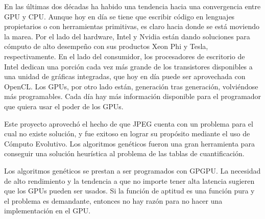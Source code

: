 En las últimas dos décadas ha habido una tendencia hacia una convergencia entre
GPU y CPU. Aunque hoy en día se tiene que escribir código en lenguajes
propietarios o con herramientas primitivas, es claro hacia donde se está
moviendo la marea. Por el lado del hardware, Intel y Nvidia están dando
soluciones para cómputo de alto desempeño con sus productos Xeon Phi y Tesla,
respectivamente. En el lado del consumidor, los procesadores de escritorio de
Intel dedican una porción cada vez más grande de los transistores disponibles a
una unidad de gráficas integradas, que hoy en día puede ser aprovechada con
OpenCL. Los GPUs, por otro lado están, generación tras generación, volviéndose
más programables. Cada día hay más información disponible para el programador
que quiera usar el poder de los GPUs.

Este proyecto aprovechó el hecho de que JPEG cuenta con un problema para el
cual no existe solución, y fue exitoso en lograr su propósito mediante el uso
de \gls{Cómputo Evolutivo}. Los algoritmos genéticos fueron una gran herramienta
para conseguir una solución heurística al problema de las tablas de
cuantificación.

Los algoritmos genéticos se prestan a ser programados con \gls{GPGPU}. La
necesidad de alto rendimiento y la tendencia a que no importe tener alta
latencia sugieren que los GPUs pueden ser usados. Si la función de aptitud es
una función pura y el problema es demandante, entonces no hay razón para no
hacer una implementación en el GPU.
